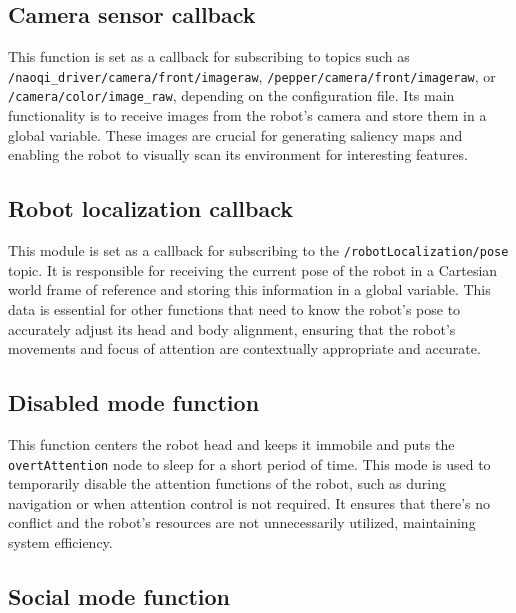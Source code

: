 \documentclass{CSSRforAfrica}
\begin{document}
\subsection{Camera sensor callback}

This function is set as a callback for subscribing to topics such as\\ \texttt{/naoqi\_driver/camera/front/imageraw}, \texttt{/pepper/camera/front/imageraw}, or \texttt{/camera/color/image\_raw}, depending on the configuration file. Its main functionality is to receive images from the robot's camera and store them in a global variable. These images are crucial for generating saliency maps and enabling the robot to visually scan its environment for interesting features.

\subsection{Robot localization callback}

This module is set as a callback for subscribing to the \texttt{/robotLocalization/pose} topic. It is responsible for receiving the current pose of the robot in a Cartesian world frame of reference and storing this information in a global variable. This data is essential for other functions that need to know the robot's pose to accurately adjust its head and body alignment, ensuring that the robot's movements and focus of attention are contextually appropriate and accurate.

\subsection{Disabled mode function}

This function centers the robot head and keeps it immobile and puts the \texttt{overtAttention} node to sleep for a short period of time. This mode is used to temporarily disable the attention functions of the robot, such as during navigation or when attention control is not required. It ensures that there's no conflict and the robot's resources are not unnecessarily utilized, maintaining system efficiency.

\subsection{Social mode function}

\end{document}
